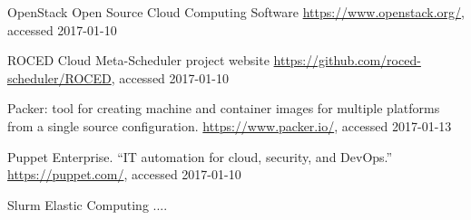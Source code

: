 

\begin{thebibliography}{}
%
%
OpenStack Open Source Cloud Computing Software
\url{https://www.openstack.org/}, accessed 2017-01-10

ROCED Cloud Meta-Scheduler project website
\url{https://github.com/roced-scheduler/ROCED}, accessed 2017-01-10


Packer: tool for creating machine and container images for multiple platforms from a single source configuration. 
\url{https://www.packer.io/}, accessed 2017-01-13


Puppet Enterprise. ``IT automation for cloud, security, and DevOps.''
\url{https://puppet.com/}, accessed 2017-01-10

Slurm Elastic Computing ....
\end{thebibliography}



